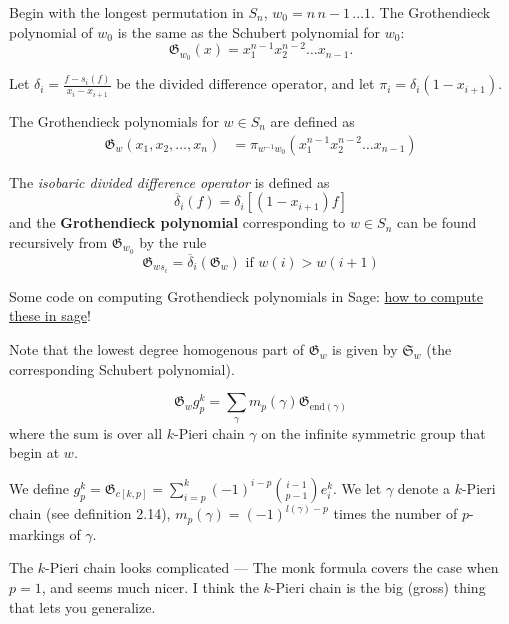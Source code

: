 Begin with the longest permutation in $S_n$, $w_0 = n \, n-1 \, \dots 1$. The Grothendieck polynomial of $w_0$ is the same as the Schubert polynomial for $w_0$:
\[
    \mathfrak{G}_{w_0}(x) = x_1^{n-1} x_2^{n-2} \dots x_{n-1}.
\]
\begin{definition}
Let $\delta_i = \frac{f - s_i(f)}{x_i - x_{i+1}}$ be the divided difference operator, and let $\pi_i = \delta_i(1-x_{i+1})$. 

The Grothendieck polynomials for $w \in S_n$ are defined as
\begin{align*}
    \mathfrak{G}_w(x_1, x_2, \ldots, x_n) &= \pi_{w^{-1}w_0}(x_1^{n-1} x_2^{n-2} \ldots x_{n-1}) 
\end{align*}
\end{definition}

\begin{definition}
The \textit{isobaric divided difference operator} is defined as
\[
    \overline{\delta}_i(f) = \delta_i[(1-x_{i+1})f]
\] 
and the \textbf{Grothendieck polynomial} corresponding to $w \in S_n$ can be found recursively from $\mathfrak{G}_{w_0}$ by the rule
\[
    \mathfrak{G}_{ws_i} = \overline{\delta}_i(\mathfrak{G}_w) \text{ if $w(i) > w(i+1)$}
\]
\end{definition}

Some code on computing Grothendieck polynomials in Sage: \href{https://wiki.sagemath.org/combinat/MultivariatePolynomials}{how to compute these in sage}!

Note that the lowest degree homogenous part of $\mathfrak{G}_w$ is given by $\mathfrak{S}_w$ (the corresponding Schubert polynomial). 

\begin{theorem}
    \begin{equation*}
        \mathfrak{G}_wg_p^k = \sum_\gamma m_p(\gamma) \mathfrak{G}_{\text{end}(\gamma)}
    \end{equation*} 
    where the sum is over all $k$-Pieri chain $\gamma$ on the infinite symmetric group that begin at $w$.

    We define $g_p^k = \mathfrak{G}_{c[k,p]} = \sum_{i=p}^k (-1)^{i-p} {{i-1}\choose{p-1}} e_i^k$. We let $\gamma$ denote a $k$-Pieri chain (see definition 2.14), $m_p(\gamma) = (-1)^{l(\gamma) -p}$ times the number of $p$-markings of $\gamma$.
\end{theorem}
The $k$-Pieri chain looks complicated — The monk formula covers the case when $p = 1$, and seems much nicer. I think the $k$-Pieri chain is the big (gross) thing that lets you generalize.

